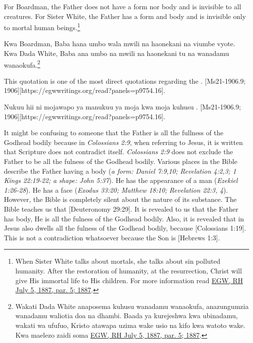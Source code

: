 For Boardman, the Father does not have a form nor body and is invisible to all creatures. For Sister White, the Father has a form and body and is invisible only to mortal human beings.\footnote{When Sister White talks about mortals, she talks about sin polluted humanity. After the restoration of humanity, at the resurrection, Christ will give His immortal life to His children. For more information read \href{https://egwwritings.org/?ref=en_RH.July.5.1887.par.5}{EGW, RH July 5, 1887, par. 5; 1887}.}


Kwa Boardman, Baba hana umbo wala mwili na haonekani na viumbe vyote. Kwa Dada White, Baba ana umbo na mwili na haonekani tu na wanadamu wanaokufa.\footnote{Wakati Dada White anaposema kuhusu wanadamu wanaokufa, anazungumzia wanadamu waliotia doa na dhambi. Baada ya kurejeshwa kwa ubinadamu, wakati wa ufufuo, Kristo atawapa uzima wake usio na kifo kwa watoto wake. Kwa maelezo zaidi soma \href{https://egwwritings.org/?ref=en_RH.July.5.1887.par.5}{EGW, RH July 5, 1887, par. 5; 1887}.}


This quotation is one of the most direct quotations regarding the . [Ms21-1906.9; 1906][https://egwwritings.org/read?panels=p9754.16].


Nukuu hii ni mojawapo ya manukuu ya moja kwa moja kuhusu . [Ms21-1906.9; 1906][https://egwwritings.org/read?panels=p9754.16].


It might be confusing to someone that the Father is all the fullness of the Godhead bodily because in \textit{Colossians 2:9}, when referring to Jesus, it is written that  Scripture does not contradict itself. \textit{Colossians 2:9} does not exclude the Father to be all the fulness of the Godhead bodily. Various places in the Bible describe the Father having a body (\textit{a form: Daniel 7:9,10; Revelation 4:2,3; 1 Kings 22:19-22; a shape: John 5:37}). He has the appearance of a man (\textit{Ezekiel 1:26-28}). He has a face (\textit{Exodus 33:20; Matthew 18:10; Revelation 22:3, 4}). However, the Bible is completely silent about the nature of its substance. The Bible teaches us that [Deuteronomy 29:29]. It is revealed to us that the Father has body, He is all the fulness of the Godhead bodily. Also, it is revealed that in Jesus also dwells all the fulness of the Godhead bodily, because [Colossians 1:19]. This is not a contradiction whatsoever because the Son is [Hebrews 1:3].


